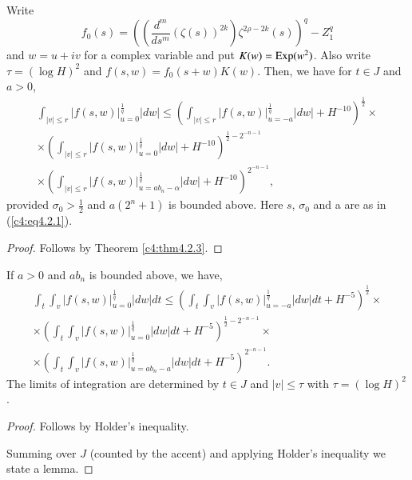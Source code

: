 \begin{lem}\label{c4:lem9}
Write 
\begin{equation*}
f_0 (s) = \left( \left( \frac{d^m}{ds^m} (\zeta(s))^{2k} \right) \zeta^{2\rho - 2k} (s)\right)^q - Z^q_1  \tag{4.2.11}\label{c4:eq4.2.11}
\end{equation*}
and $w = u + iv$ for a complex variable and put $K(w) = \operatorname{Exp} (w^2)$. Also write $\tau = (\log H)^2$ and $f(s,w) = f_0 (s+w) K(w)$. Then, we have for $t \in J$ and $a>0$,
\begin{gather*}
\int_{|v| \leq r} |f(s,w)|^{\frac{1}{q}}_{u=0}  |dw| \leq \left( \int_{|v| \leq r} |f(s,w)|^{\frac{1}{q}}_{u=-a} |dw| + H^{-10}\right)^{\frac{1}{2}} \times\\
\times \left( \int_{|v| \leq r} |f(s,w)|^{\frac{1}{q}}_{u=0} |dw|  + H^{-10}\right)^{\frac{1}{2} - 2^{-n-1}}\\
\times \left(\int_{|v| \leq r} |f(s,w)|^{\frac{1}{q}}_{u =a b_n -\alpha} |dw| + H^{-10}\right)^{2^{-n-1}}, \tag{4.2.12}\label{c4:eq4.2.12}
\end{gather*}\pageoriginale
provided $\sigma_0 > \frac{1}{2}$ and $a (2^n+1)$ is bounded above. Here $s$, $\sigma_0$ and a are as in (\ref{c4:eq4.2.1}).
\end{lem}

\begin{proof}
Follows by Theorem \ref{c4:thm4.2.3}.
\end{proof}

\begin{lem}\label{c4:lem10}
If $a > 0$ and $ab_n$ is bounded above, we have,
\begin{gather*}
\int_t \int_v |f(s,w)|^{\frac{1}{q}}_{u=0} |dw| dt \leq  \left( \int_t \int_v |f(s,w)|^{\frac{1}{q}}_{u=- a} |dw| dt + H^{-5}\right)^{\frac{1}{2}} \times\\
\times \left(\int_t\int_v |f(s,w)|^{\frac{1}{q}}_{u=0} |dw| dt + H^{-5} \right)^{\frac{1}{2} - 2^{-n-1}} \times \\
\times \left(\int_t \int_v |f(s,w)|^{\frac{1}{q}}_{u=ab_n -a} |dw| dt + H^{-5} \right)^{2^{-n-1}} . \tag{4.2.13}\label{c4:eq4.2.13}
\end{gather*}
The limits of integration are determined by $t \in J$ and $|v| \leq \tau$ with $\tau = (\log H)^2$.
\end{lem}

\begin{proof}
Follows by Holder's inequality.

Summing over $J$ (counted by the accent) and applying Holder's inequality we state a lemma.
\end{proof}

